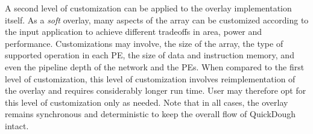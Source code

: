 A second level of customization can be applied to the overlay implementation itself.
As a \emph{soft} overlay, many aspects of the array can be customized according to the input application to achieve different tradeoffs in area, power and performance.  Customizations may involve, the size of the array, the type of supported operation in each PE, the size of data and instruction memory, and even the pipeline depth of the network and the PEs.  
When compared to the first level of customization, this level of customization involves reimplementation of the overlay and requires considerably longer run time.
User may therefore opt for this level of customization only as needed.
Note that in all cases, the overlay remains synchronous and deterministic to keep the overall flow of QuickDough intact.






